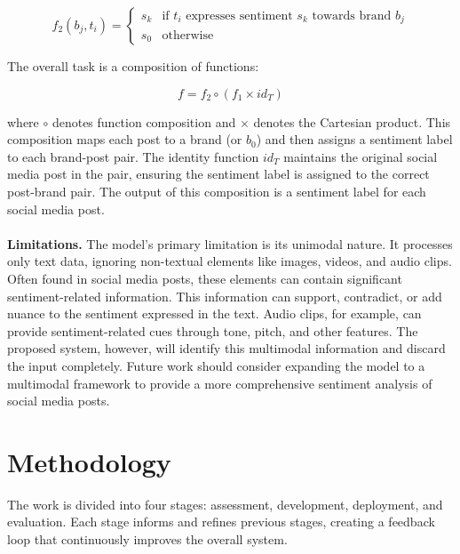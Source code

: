 \documentclass{article}
\begin{document}
\[
    f_2(b_j, t_i) =
    \begin{cases}
        s_k & \text{if } t_i \text{ expresses sentiment } s_k \text{ towards
        brand } b_j                                                          \\
        s_0 & \text{otherwise}
    \end{cases}
\]

The overall task is a composition of functions:

\[
    f = f_2 \circ (f_1 \times id_T)
\]

where $\circ$ denotes function composition and $\times$ denotes the Cartesian
product. This composition maps each post to a brand (or $b_0$) and then assigns
a sentiment label to each brand-post pair. The identity function $id_T$
maintains the original social media post in the pair, ensuring the sentiment
label is assigned to the correct post-brand pair. The output of this
composition is a sentiment label for each social media post.\\
\\
\textbf{Limitations.} The model's primary limitation is its unimodal nature. It
processes only text data, ignoring non-textual elements like images, videos,
and audio clips. Often found in social media posts, these elements can contain
significant sentiment-related information. This information can support,
contradict, or add nuance to the sentiment expressed in the text. Audio clips,
for example, can provide sentiment-related cues through tone, pitch, and other
features. The proposed system, however, will identify this multimodal
information and discard the input completely. Future work should consider
expanding the model to a multimodal framework to provide a more comprehensive
sentiment analysis of social media posts.

\section{Methodology}

The work is divided into four stages: assessment, development, deployment, and
evaluation. Each stage informs and refines previous stages, creating a feedback
loop that continuously improves the overall system.
\end{document}
